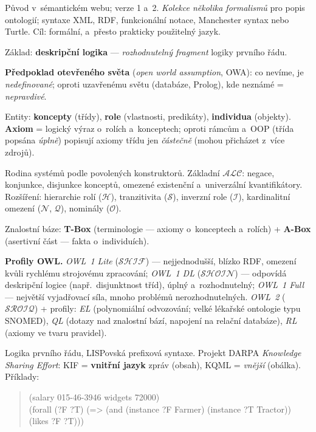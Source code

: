 \documentclass[11pt,a4paper]{article}
\theoremstyle{definition}
\begin{document}
\begin{defbox}
Původ v~sémantickém webu; verze 1 a~2. \emph{Kolekce několika formalismů} pro popis
ontologií; syntaxe XML, RDF, funkcionální notace, Manchester syntax nebo Turtle. Cíl:
formální, a~přesto prakticky použitelný jazyk.

Základ: \textbf{deskripční logika} --- \emph{rozhodnutelný fragment} logiky prvního řádu.

\textbf{Předpoklad otevřeného světa} (\emph{open world assumption}, OWA): co nevíme, je
\emph{nedefinované}; oproti uzavřenému světu (databáze, Prolog), kde neznámé = \emph{nepravdivé}.
\end{defbox}

\begin{defbox}
Entity: \textbf{koncepty} (třídy), \textbf{role} (vlastnosti, predikáty),
\textbf{individua} (objekty). \textbf{Axiom} = logický výraz o~rolích a~konceptech; oproti
rámcům a~OOP (třída popsána \emph{úplně}) popisují axiomy třídu jen \emph{částečně}
(mohou přicházet z~více zdrojů).

Rodina systémů podle povolených konstruktorů. Základní $\mathcal{ALC}$: negace, konjunkce,
disjunkce konceptů, omezené existenční a~univerzální kvantifikátory. Rozšíření: hierarchie
rolí ($\mathcal{H}$), tranzitivita ($\mathcal{S}$), inverzní role ($\mathcal{I}$),
kardinalitní omezení ($\mathcal{N}$, $\mathcal{Q}$), nominály ($\mathcal{O}$).

Znalostní báze: \textbf{T-Box} (terminologie --- axiomy o~konceptech a~rolích)
+ \textbf{A-Box} (asertivní část --- fakta o~individuích).
\end{defbox}

\textbf{Profily OWL.} \emph{OWL~1 Lite} ($\mathcal{SHIF}$) --- nejjednodušší, blízko RDF,
omezení kvůli rychlému strojovému zpracování; \emph{OWL~1 DL} ($\mathcal{SHOIN}$) --- odpovídá
deskripční logice (např.\ disjunktnost tříd), úplný a~rozhodnutelný; \emph{OWL~1 Full} ---
největší vyjadřovací síla, mnoho problémů nerozhodnutelných. \emph{OWL~2} ($\mathcal{SROIQ}$)
+ profily: \emph{EL} (polynomiální odvozování; velké lékařské ontologie typu SNOMED),
\emph{QL} (dotazy nad znalostní bází, napojení na relační databáze), \emph{RL} (axiomy ve
tvaru pravidel).

\begin{defbox}
Logika prvního řádu, LISPovská prefixová syntaxe. Projekt DARPA \emph{Knowledge Sharing
Effort}: KIF = \textbf{vnitřní jazyk} zpráv (obsah), KQML = \emph{vnější} (obálka). Příklady:
\begin{quote}\small\ttfamily
(salary 015-46-3946 widgets 72000)\\
(forall (?F ?T) (=> (and (instance ?F Farmer) (instance ?T Tractor)) (likes ?F ?T)))
\end{quote}
\end{defbox}
\end{document}
